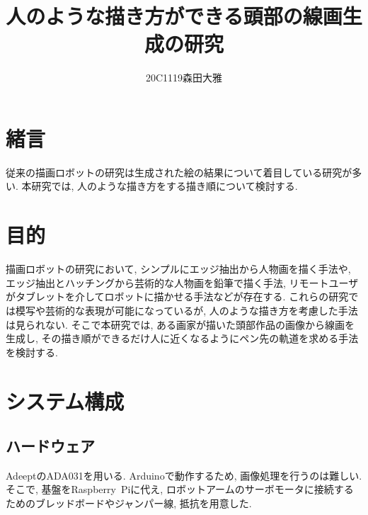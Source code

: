 \documentclass[10pt]{jarticle}
\begin{document}
    
    \makeatletter
    \title{人のような描き方ができる頭部の線画生成の研究}{}
    
    \author{20C1119\hspace{.5zw}森田大雅}
    
    \makeatother
    
    
    
    \maketitle
    
    
    \section{緒\hspace{2zw}言}%
	従来の描画ロボットの研究は生成された絵の結果について着目している研究が多い.
	本研究では, 人のような描き方をする描き順について検討する.

    \section{目的}
	描画ロボットの研究において, シンプルにエッジ抽出から人物画を描く手法\cite{1}や, エッジ抽出とハッチングから芸術的な人物画を鉛筆で描く手法\cite{2}, リモートユーザがタブレットを介してロボットに描かせる手法\cite{3}などが存在する.
	これらの研究では模写や芸術的な表現が可能になっているが, 人のような描き方を考慮した手法は見られない.
	そこで本研究では, ある画家が描いた頭部作品の画像から線画を生成し, その描き順ができるだけ人に近くなるようにペン先の軌道を求める手法を検討する.
    
    \section{システム構成}
	
	\subsection{ハードウェア}
	AdeeptのADA031を用いる. Arduinoで動作するため, 画像処理を行うのは難しい.
	そこで, 基盤をRaspberry\ Piに代え, ロボットアームのサーボモータに接続するためのブレッドボードやジャンパー線, 抵抗を用意した.
	
\end{document}
